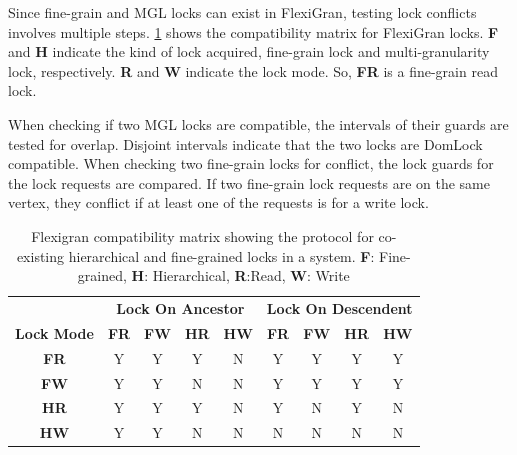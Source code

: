 Since fine-grain and MGL locks can exist in FlexiGran, testing lock conflicts involves multiple steps. \cref{tab:flexigran_locks} shows the compatibility matrix for FlexiGran locks. \textbf{F} and \textbf{H} indicate the kind of lock acquired, fine-grain lock and multi-granularity lock, respectively. \textbf{R} and \textbf{W} indicate the lock mode. So, \textbf{FR} is a fine-grain read lock.

When checking if two MGL locks are compatible, the intervals of their guards are tested for overlap. Disjoint intervals indicate that the two locks are DomLock compatible. When checking two fine-grain locks for conflict, the lock guards for the lock requests are compared. If two fine-grain lock requests are on the same vertex, they conflict if at least one of the requests is for a write lock.


\begin{table}[h]
    \centering
    \captionsetup{justification=centering}
    \begin{tabular}{c|cccc|cccc|}
        \multicolumn{1}{c}{} & \multicolumn{4}{c|}{\textbf{Lock On Ancestor}} & \multicolumn{4}{c}{\textbf{Lock On Descendent}} \\
        \cline{2-9}
        \textbf{Lock Mode} & \textbf{FR} & \textbf{FW} & \textbf{HR} & \textbf{HW} & \textbf{FR} & \textbf{FW} & \textbf{HR} & \textbf{HW} \\
        \hline
        \textbf{FR} & \cellcolor{green!25} Y & \cellcolor{green!25} Y & \cellcolor{green!25} Y & \cellcolor{red!25} N & \cellcolor{green!25} Y & \cellcolor{green!25} Y & \cellcolor{green!25} Y & \cellcolor{green!25} Y \\
        \textbf{FW} & \cellcolor{green!25} Y & \cellcolor{green!25} Y & \cellcolor{red!25} N & \cellcolor{red!25} N & \cellcolor{green!25} Y & \cellcolor{green!25} Y & \cellcolor{green!25} Y & \cellcolor{green!25} Y \\
        \textbf{HR} & \cellcolor{green!25} Y & \cellcolor{green!25} Y & \cellcolor{green!25} Y & \cellcolor{red!25} N & \cellcolor{green!25} Y & \cellcolor{red!25} N & \cellcolor{green!25} Y & \cellcolor{red!25} N \\
        \textbf{HW} & \cellcolor{green!25} Y & \cellcolor{green!25} Y & \cellcolor{red!25} N & \cellcolor{red!25} N & \cellcolor{red!25} N & \cellcolor{red!25} N & \cellcolor{red!25} N & \cellcolor{red!25} N \\
    \end{tabular}
    \caption{Flexigran compatibility matrix showing the protocol for co-existing hierarchical and fine-grained locks in a system. \textbf{F}: Fine-grained, \textbf{H}: Hierarchical, \textbf{R}:Read, \textbf{W}: Write}
    \label{tab:flexigran_locks}
\end{table}

